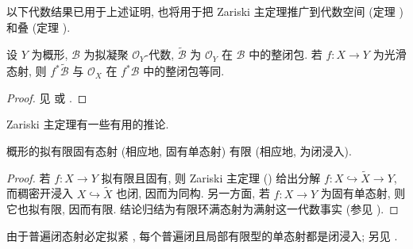 以下代数结果已用于上述证明, 也将用于把 Zariski 主定理推广到代数空间 (定理 ) 和叠 (定理 ).
\begin{proposition}\label{src:A.7.4}
设 $Y$ 为概形, $\mathcal B$ 为拟凝聚 $\mathcal O_Y$-代数, $\widetilde{\mathcal B}$ 为 $\mathcal O_Y$ 在 $\mathcal B$ 中的整闭包. 若 $f:X\to Y$ 为光滑态射, 则 $f^*\widetilde{\mathcal B}$ 与 $\mathcal O_X$ 在 $f^*\mathcal B$ 中的整闭包等同.
\end{proposition}
\begin{proof}
见 \cite[Tag 03GG]{SP} 或 \cite[命题 $16.2$]{LMB00}.
\end{proof}
Zariski 主定理有一些有用的推论.
\begin{corollary}\label{src:A.7.5}
概形的拟有限固有态射 (相应地, 固有单态射) 有限 (相应地, 为闭浸入).
\end{corollary}
\begin{proof}
若 $f:X\to Y$ 拟有限且固有, 则 Zariski 主定理 () 给出分解 $f:X\hookrightarrow\widetilde X\to Y$, 而稠密开浸入 $X\hookrightarrow\widetilde X$ 也闭, 因而为同构. 另一方面, 若 $f:X\to Y$ 为固有单态射, 则它也拟有限, 因而有限. 结论归结为有限环满态射为满射这一代数事实 (参见 \cite[Tag 04VT]{SP}).
\end{proof}
\begin{remark}\label{src:A.7.6}
由于普遍闭态射必定拟紧 \cite[Tag 04XU]{SP}, 每个普遍闭且局部有限型的单态射都是闭浸入; 另见 \cite[Tag 04XV]{SP}.
\end{remark}
